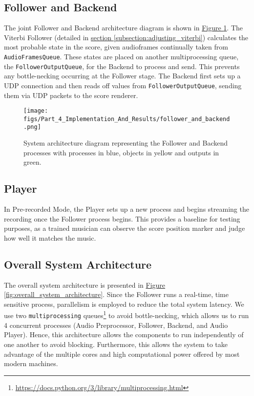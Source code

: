 \subsection{Follower and Backend}
The joint Follower and Backend architecture diagram is shown in \hyperref[fig:follwer_and_backend]{Figure \ref*{fig:follwer_and_backend}}. The Viterbi Follower (detailed in \hyperref[subsection:adjusting_viterbi]{section \ref*{subsection:adjusting_viterbi}}) calculates the most probable state in the score, given audioframes continually taken from \verb|AudioFramesQueue|. These states are placed on another multiprocessing queue, the \verb|FollowerOutputQueue|, for the Backend to process and send. This prevents any bottle-necking occurring at the Follower stage. The Backend first sets up a UDP connection and then reads off values from \verb|FollowerOutputQueue|, sending them via UDP packets to the score renderer.

\begin{figure}[H]
    \centering
    \texttt{[image: figs/Part\_4\_Implementation\_And\_Results/follower\_and\_backend.png]}
    \caption{System architecture diagram representing the Follower and Backend processes with processes in blue, objects in yellow and outputs in green.}
    \label{fig:follwer_and_backend}
\end{figure}

\subsection{Player}
In Pre-recorded Mode, the Player sets up a new process and begins streaming the recording once the Follower process begins. This provides a baseline for testing purposes, as a trained musician can observe the score position marker and judge how well it matches the music. 

\subsection{Overall System Architecture}
The overall system architecture is presented in \hyperref[fig:overall_system_architecture]{Figure \ref*{fig:overall_system_architecture}}. Since the Follower runs a real-time, time sensitive process, parallelism is employed to reduce the total system latency. We use two \verb|multiprocessing| queues\footnote{\href{https://docs.python.org/3/library/multiprocessing.html}{https://docs.python.org/3/library/multiprocessing.html}} to avoid bottle-necking, which allows us to run 4 concurrent processes (Audio Preprocessor, Follower, Backend, and Audio Player). Hence, this architecture allows the components to run independently of one another to avoid blocking. Furthermore, this allows the system to take advantage of the multiple cores and high computational power offered by most modern machines.  

